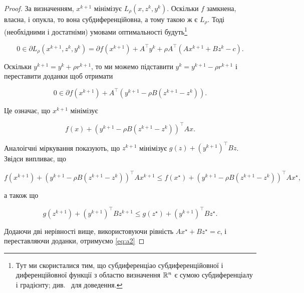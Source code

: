 \begin{proof}
    За визначенням, $x^{k + 1}$ мінімізує $L_\rho \left( x, z^k, y^k \right)$. Оскільки $f$ замкнена, власна, і опукла, то вона субдиференційовна, а тому такою ж є $L_\rho$. Тоді (необхідними і достатніми) умовами оптимальності будуть\footnote{Тут ми скористалися тим, що субдиференціао субдиференційовної і диференційовної функції з областю визначення $\mathbb{R}^n$ є сумою субдиференціалу і градієнту; див.~\cite[\S23]{140} для доведення.}

    \begin{equation*}
        0 \in \partial L_\rho \left( x^{k + 1}, z^k, y^k \right) = \partial f \left( x^{k + 1} \right) + A^\intercal y^k + \rho A^\intercal \left( A x^{k + 1} + B z^k - c \right).
    \end{equation*}

    Оскільки $y^{k + 1} = y^k + \rho r^{k + 1}$, то ми можемо підставити $y^k = y^{k + 1} - \rho r^{k +1 }$ і переставити доданки щоб отримати

    \begin{equation*}
        0 \in \partial f \left( x^{k + 1} \right) + A^\intercal \left( y^{k + 1} - \rho B \left( z^{k + 1} - z^k \right) \right).
    \end{equation*}

    Це означає, що $x^{k + 1}$ мінімізує

    \begin{equation*}
        f(x) + \left( y^{k + 1} - \rho B \left( z^{k + 1} - z^k \right) \right)^\intercal A x.
    \end{equation*}

    Аналоігчні міркування показують, що $z^{k + 1}$ мінімізує $g(z) + \left( y^{k + 1} \right)^\intercal B z$. Звідси випливає, що

    \begin{equation*}
        f \left( x^{k + 1} \right) + \left( y^{k + 1} - \rho B \left( z^{k + 1} - z^k \right) \right)^\intercal A x^{k + 1} \le f \left( x^\star \right) + \left( y^{k + 1} - \rho B \left( z^{k + 1} - z^k \right) \right)^\intercal A x^\star,
    \end{equation*}

    а також що

    \begin{equation*}
        g \left( z^{k + 1} \right) + \left( y^{k + 1} \right)^\intercal B z^{k + 1} \le g \left( z^\star \right) + \left( y^{k + 1} \right)^\intercal B z^\star.
    \end{equation*}

    Додаючи дві нерівності вище, використовуючи рівність $A x^\star + B z^\star = c$, і переставляючи доданки, отримуємо \eqref{eq:a2}
\end{proof}

